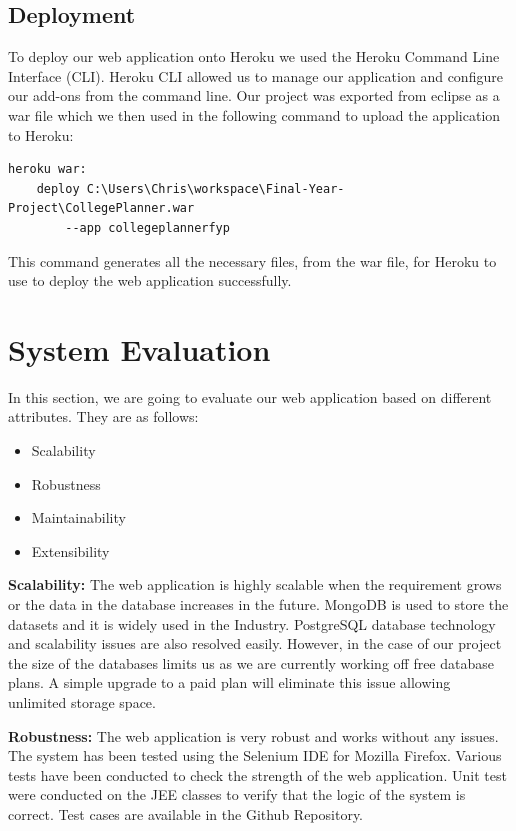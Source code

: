 \section{Deployment}
To deploy our web application onto Heroku we used the Heroku Command Line Interface (CLI). Heroku CLI allowed us to manage our application and configure our add-ons from the command line. Our project was exported from eclipse as a war file which we then used in the following command to upload the application to Heroku:

\begin{verbatim}
heroku war:
    deploy C:\Users\Chris\workspace\Final-Year-Project\CollegePlanner.war 
        --app collegeplannerfyp
\end{verbatim}

This command generates all the necessary files, from the war file, for Heroku to use to deploy the web application successfully.

\chapter{System Evaluation}
In this section, we are going to evaluate our web application based on different attributes. They are as follows:
\begin{itemize}
    \item Scalability
    \item Robustness
    \item Maintainability
    \item Extensibility
\end{itemize}

\par \textbf{Scalability:} The web application is highly scalable when the requirement grows or the data in the database increases in the future. MongoDB
is used to store the datasets and it is widely used in the Industry. PostgreSQL
database technology and scalability issues are also resolved easily. However, in the case of our project the size of the databases limits us as we are currently working off free database plans. A simple upgrade to a paid plan will eliminate this issue allowing unlimited storage space. 


\par \textbf{Robustness:} The web application is very robust and works without any issues. The system has been tested using the Selenium IDE for Mozilla Firefox. Various tests have been conducted to check the strength of the web application. Unit test were conducted on the JEE classes to verify that the logic of the system is correct. Test cases are available in the Github Repository.

